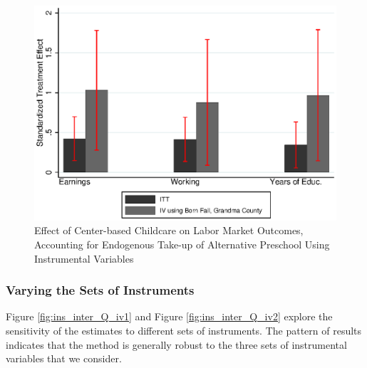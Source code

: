 \begin{appendices}
\begin{figure}[H]
		\caption{Effect of Center-based Childcare on Labor Market Outcomes, Accounting for Endogenous Take-up of Alternative Preschool Using Instrumental Variables} \label{fig:mainiv2}
		\includegraphics[width=.7\columnwidth]{output/appendixplots/main_iv_other.eps}
\end{figure}

\subsubsection{Varying the Sets of Instruments}

\noindent Figure \ref{fig:ins_inter_Q_iv1} and Figure \ref{fig:ins_inter_Q_iv2} explore the sensitivity of the estimates to different sets of instruments. The pattern of results indicates that the method is generally robust to the three sets of instrumental variables that we consider. 


\end{appendices}
